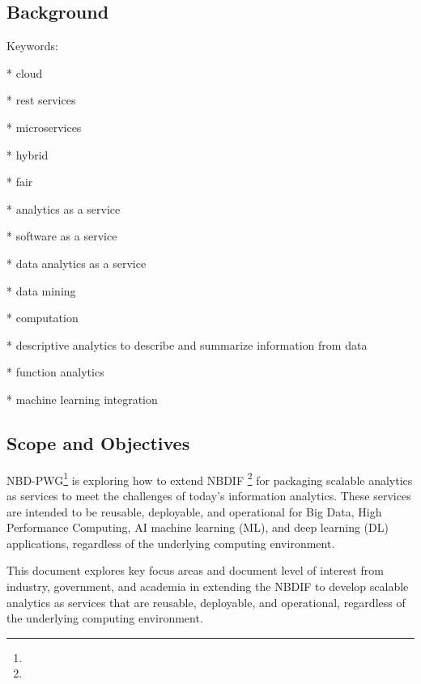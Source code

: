 
\newcommand{\WG}{\TODO{Wo: define name of wrking group}{WORKINGGROUP}}


\subsection{Background}


Keywords:

* cloud

* rest services

* microservices

* hybrid

* fair

* analytics as a service

* software as a service

* data analytics as a service

* data mining

* computation

* descriptive analytics to describe and summarize information from data

* function analytics

* machine learning integration


\subsection{Scope and Objectives}

NBD-PWG\footnote{} is exploring how to extend
NBDIF \footnote{} for packaging scalable analytics as services to meet the
challenges of today's information analytics. These services are
intended to be reusable, deployable, and operational for Big Data,
High Performance Computing, AI machine learning (ML), and deep
learning (DL) applications, regardless of the underlying computing
environment.

This document explores key focus areas and document level of interest
from industry, government, and academia in extending the NBDIF to
develop scalable analytics as services that are reusable, deployable,
and operational, regardless of the underlying computing environment.


